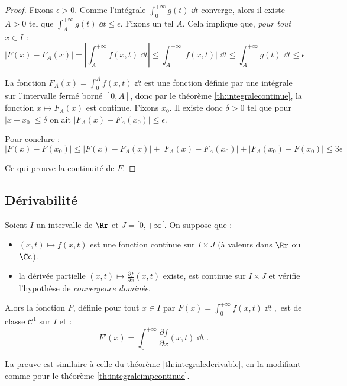 \documentclass[class=report,crop=false]{standalone}
\begin{document}
\begin{proof}
Fixons $\epsilon>0$. Comme l'intégrale $\int_0^{+\infty} g(t)\;\dd t$ converge, alors
il existe $A>0$ tel que $\int_A^{+\infty} g(t)\;\dd t \le \epsilon$. Fixons un tel $A$.
Cela implique que, \emph{pour tout} $x \in I$ :
$$\big| F(x)-F_A(x)\big| 
= \left|\int_A^{+\infty} f(x,t)\;\dd t \right|
\le \int_A^{+\infty} \big| f(x,t) \big|\;\dd t 
\le \int_A^{+\infty} g(t)\;\dd t
\le \epsilon$$

La fonction $F_A(x) = \int_0^A f(x,t)\;\dd t$ est une fonction définie par une intégrale 
sur l'intervalle fermé borné $[0,A]$, donc par le théorème \ref{th:integralecontinue}, 
la fonction $x \mapsto F_A(x)$ est continue.
Fixons $x_0$. Il existe donc $\delta>0$ tel que pour $|x-x_0| \le \delta$ on ait
$\big|F_A(x)-F_A(x_0)\big| \le \epsilon$.


Pour conclure :
$$\big|F(x) -F(x_0)\big| 
\le \big|F(x) -F_A(x)\big|+\big|F_A(x)-F_A(x_0)\big|+\big|F_A(x_0)-F(x_0)\big|
\le 3\epsilon$$

Ce qui prouve la continuité de $F$.
\end{proof}



\subsection{Dérivabilité}

\begin{theoreme}
\label{th:integraleimpderivable}
Soient $I$ un intervalle de $\Rr$ et $J=[0,+\infty[$.
On suppose que :
\begin{itemize}
  \item $(x,t) \longmapsto f(x,t)$ est une fonction continue sur $I\times J$
  (à valeurs dans $\Rr$ ou $\Cc$).
  
  \item la dérivée partielle $(x,t) \longmapsto \frac{\partial f}{\partial x}(x,t)$
  existe, est continue sur $I\times J$ et vérifie l'hypothèse de \emph{convergence dominée}.
  
\end{itemize}
Alors la fonction $F$, définie pour
tout $x\in I$ par $\displaystyle F(x) = \int_0^{+\infty} f(x,t)\;\dd t\;,$ 
est de classe $\mathcal{C}^1$ sur $I$ et :
$$F'(x) = \int_0^{+\infty} \frac{\partial f}{\partial x}(x,t)\;\dd t\;.$$
\end{theoreme}


La preuve est similaire à celle du théorème \ref{th:integralederivable},
en la modifiant comme pour le théorème \ref{th:integraleimpcontinue}.
\end{document}
